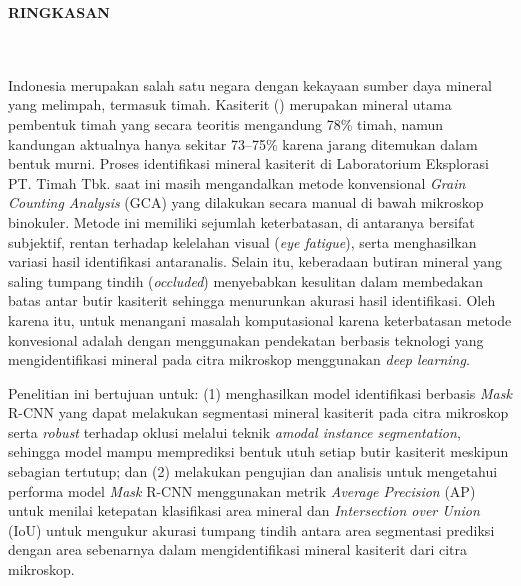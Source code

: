 \clearpage
{}%
\thispagestyle{fancy}

\begin{center}
	\large \bfseries \MakeUppercase{Ringkasan}\\
	\normalsize \normalfont {\thetitle}\\
	\normalsize \normalfont {\theauthor}\\
	\bigskip
	
	\normalsize \normalfont \justifying
	\normalsize \normalfont \justifying
	Indonesia merupakan salah satu negara dengan kekayaan sumber daya mineral yang melimpah, termasuk timah. Kasiterit (\senyawatin) merupakan mineral utama pembentuk timah yang secara teoritis mengandung 78\% timah, namun kandungan aktualnya hanya sekitar 73–75\% karena jarang ditemukan dalam bentuk murni. Proses identifikasi mineral kasiterit di Laboratorium Eksplorasi PT. Timah Tbk. saat ini masih mengandalkan metode konvensional \textit{Grain Counting Analysis} (GCA) yang dilakukan secara manual di bawah mikroskop binokuler. Metode ini memiliki sejumlah keterbatasan, di antaranya bersifat subjektif, rentan terhadap kelelahan visual (\textit{eye fatigue}), serta menghasilkan variasi hasil identifikasi antaranalis. Selain itu, keberadaan butiran mineral yang saling tumpang tindih (\textit{occluded}) menyebabkan kesulitan dalam membedakan batas antar butir kasiterit sehingga menurunkan akurasi hasil identifikasi. Oleh karena itu, untuk menangani masalah komputasional karena keterbatasan metode konvesional adalah dengan menggunakan pendekatan berbasis teknologi yang mengidentifikasi mineral pada citra mikroskop menggunakan  \textit{deep learning}. \par

	Penelitian ini bertujuan untuk: (1) menghasilkan model identifikasi berbasis \textit{Mask} R-CNN yang dapat melakukan segmentasi mineral kasiterit pada citra mikroskop serta \textit{robust} terhadap oklusi melalui teknik \textit{amodal instance segmentation}, sehingga model mampu memprediksi bentuk utuh setiap butir kasiterit meskipun sebagian tertutup; dan (2) melakukan pengujian dan analisis untuk mengetahui performa model \textit{Mask} R-CNN menggunakan metrik \textit{Average Precision} (AP) untuk menilai ketepatan klasifikasi area mineral dan \textit{Intersection over Union} (IoU) untuk mengukur akurasi tumpang tindih antara area segmentasi prediksi dengan area sebenarnya dalam mengidentifikasi mineral kasiterit dari citra mikroskop. \par


\end{center}
